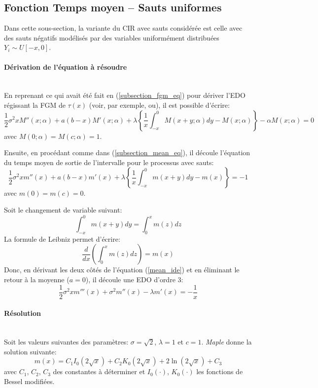 \subsection{Fonction Temps moyen -- Sauts uniformes}\label{subsection_mean_jumps}
Dans cette sous-section, la variante du \ac{CIR} avec sauts considérée est celle avec des sauts négatifs modélisés par des variables uniformément distribuées $Y_i\sim U[-x,0]$.

\paragraph{Dérivation de l'équation à résoudre}\phantom{}\\
En reprenant ce qui avait été fait en (\ref{subsection_fgm_eq}) pour dériver l'\acs{EDO} régissant la \acl{FGM} de $\tau(x)$ (voir, par exemple,\cite{cox2017} ou\cite{lefebvre2007}), il est possible d'écrire:
\[
\frac{1}{2}\sigma^2 xM''(x;\alpha)+a(b-x)M'(x;\alpha)+\lambda\left\{\frac{1}{x}\int_{-x}^0M(x+y;\alpha)dy-M(x;\alpha)\right\}-\alpha M(x;\alpha)=0
\]
avec $M(0;\alpha)=M(c;\alpha)=1$.

Ensuite, en procédant comme dans (\ref{subsection_mean_eq}), il découle l'équation du temps moyen de sortie de l'intervalle pour le processus avec sauts:
\begin{equation}\label{mean_ide}
    \frac{1}{2}\sigma^2 xm''(x)+a(b-x)m'(x)+\lambda\left\{\frac{1}{x}\int_{-x}^0m(x+y)dy-m(x)\right\}=-1
\end{equation}
avec $m(0)=m(c)=0$.

Soit le changement de variable suivant:
\[
\int_{-x}^0m(x+y)dy=\int_0^x m(z)dz
\]
La formule de Leibniz permet d'écrire:
\[
\frac{d}{dx}\left(\int_0^x m(z)dz\right)=m(x)
\]
Donc, en dérivant les deux côtés de l'équation (\ref{mean_ide}) et en éliminant le retour à la moyenne ($a=0$), il découle une \acs{EDO} d'ordre 3:
\begin{equation}\label{mean_3rd_order}
    \frac{1}{2}\sigma^2xm'''(x)+\sigma^2m''(x)-\lambda m'(x)=-\frac{1}{x}
\end{equation}

\paragraph{Résolution}\phantom{}\\
Soit les valeurs suivantes des paramètres: $\sigma=\sqrt{2}$, $\lambda=1$ et $c=1$. \textit{Maple} donne la solution suivante:
\begin{equation}\label{sol_mean_with_jumps}
    m(x)=C_1I_0(2\sqrt{x})+C_2K_0(2\sqrt{x})+2\ln(2\sqrt{x})+C_3
\end{equation}
avec $C_1$, $C_2$, $C_3$ des constantes à déterminer et $I_0(\cdot)$, $K_0(\cdot)$ les fonctions de Bessel modifiées.

